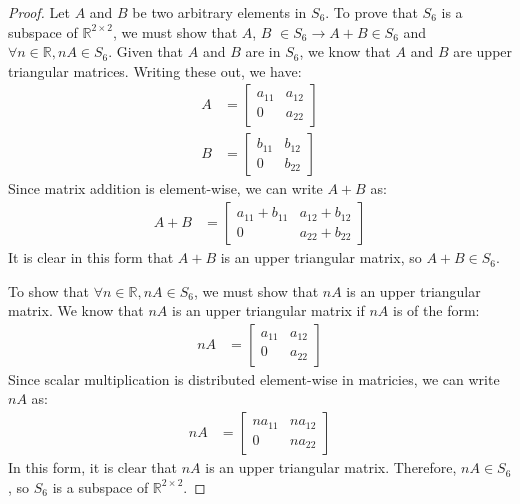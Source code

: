 \documentclass{article}
\begin{document}
\begin{proof}
Let \( A \) and \( B \) be two arbitrary elements in \( S_{6} \).
To prove that \( S_{6} \) is a subspace of \( \mathbb{R}^{2 \times 2} \), we must show that \( A \), \( B \) \( \in S_{6} \rightarrow A + B \in S_{6} \) and \( \forall n \in \mathbb{R}, nA \in S_{6} \).
Given that \( A \) and \( B \) are in \( S_{6} \), we know that \( A \) and \( B \) are upper triangular matrices.
Writing these out, we have:
\begin{align*} 
    A &= \begin{bmatrix} a_{11} & a_{12} \\ 0 & a_{22} \end{bmatrix} \\ 
    B &= \begin{bmatrix} b_{11} & b_{12} \\ 0 & b_{22} \end{bmatrix} 
\end{align*}
Since matrix addition is element-wise, we can write \( A + B \) as:
\begin{align*} 
    A + B &= \begin{bmatrix} a_{11} + b_{11} & a_{12} + b_{12} \\ 0 & a_{22} + b_{22} \end{bmatrix}
\end{align*}
It is clear in this form that \( A + B \) is an upper triangular matrix, so \( A + B \in S_{6} \).

To show that \( \forall n \in \mathbb{R}, nA \in S_{6} \), we must show that \( nA \) is an upper triangular matrix.
We know that \( nA \) is an upper triangular matrix if \( nA \) is of the form:
\begin{align*} 
    nA &= \begin{bmatrix} a_{11} & a_{12} \\ 0 & a_{22} \end{bmatrix}
\end{align*}
Since scalar multiplication is distributed element-wise in matricies, we can write \( nA \) as:
\begin{align*} 
    nA &= \begin{bmatrix} na_{11} & na_{12} \\ 0 & na_{22} \end{bmatrix}
\end{align*}
In this form, it is clear that \( nA \) is an upper triangular matrix.
Therefore, \( nA \in S_{6} \), so \( S_{6} \) is a subspace of \( \mathbb{R}^{2 \times 2} \).
\end{proof}
    
\end{document}
